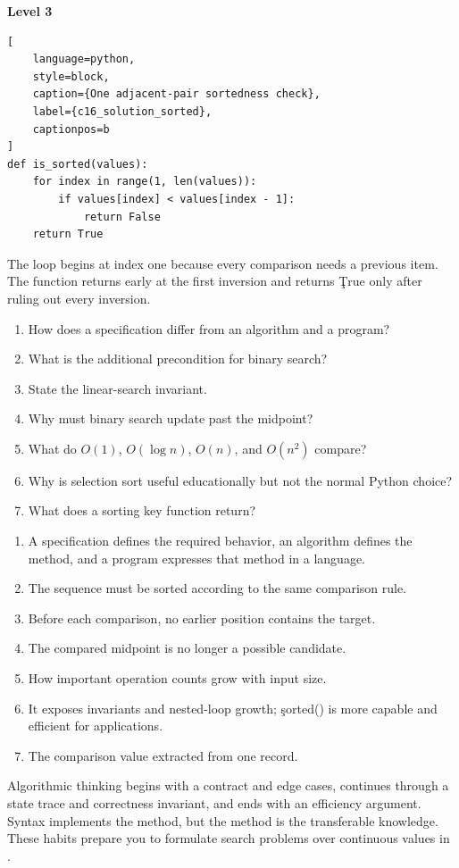 \textbf{Level 3}

\begin{lstlisting}[
    language=python,
    style=block,
    caption={One adjacent-pair sortedness check},
    label={c16_solution_sorted},
    captionpos=b
]
def is_sorted(values):
    for index in range(1, len(values)):
        if values[index] < values[index - 1]:
            return False
    return True
\end{lstlisting}

The loop begins at index one because every comparison needs a previous item.
The function returns early at the first inversion and returns \c{True} only
after ruling out every inversion.


\begin{enumerate}
    \item How does a specification differ from an algorithm and a program?
    \item What is the additional precondition for binary search?
    \item State the linear-search invariant.
    \item Why must binary search update past the midpoint?
    \item What do $O(1)$, $O(\log n)$, $O(n)$, and $O(n^2)$ compare?
    \item Why is selection sort useful educationally but not the normal Python choice?
    \item What does a sorting key function return?
\end{enumerate}


\begin{enumerate}
    \item A specification defines the required behavior, an algorithm defines
          the method, and a program expresses that method in a language.
    \item The sequence must be sorted according to the same comparison rule.
    \item Before each comparison, no earlier position contains the target.
    \item The compared midpoint is no longer a possible candidate.
    \item How important operation counts grow with input size.
    \item It exposes invariants and nested-loop growth; \c{sorted()} is more
          capable and efficient for applications.
    \item The comparison value extracted from one record.
\end{enumerate}

\begin{tcolorbox}[title=Chapter summary,colframe=orange,colback=white,arc=2mm]
Algorithmic thinking begins with a contract and edge cases, continues through
a state trace and correctness invariant, and ends with an efficiency argument.
Syntax implements the method, but the method is the transferable knowledge.
These habits prepare you to formulate search problems over continuous values
in .
\end{tcolorbox}
